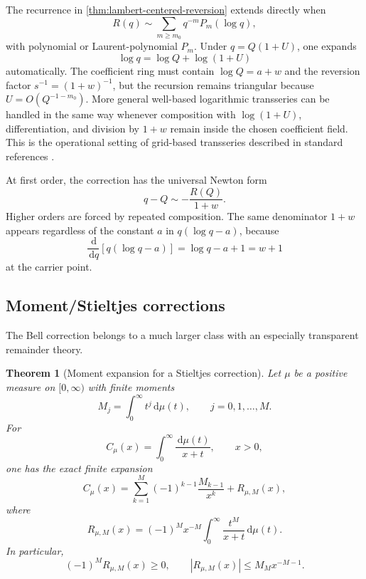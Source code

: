 \documentclass[11pt]{article}
\numberwithin{equation}{section}
\theoremstyle{mainthm}
\newtheorem{theorem}{Theorem}[section]
\theoremstyle{defstyle}
\theoremstyle{remark}
\newcommand{\dd}{\,\mathrm d}
\newcommand{\abs}[1]{\left|#1\right|}
\begin{document}
The recurrence in \cref{thm:lambert-centered-reversion} extends directly when
\begin{equation}\label{eq:R-polylog}
 R(q)\sim\sum_{m\ge m_0}q^{-m}P_m(\log q),
\end{equation}
with polynomial or Laurent-polynomial \(P_m\).  Under \(q=Q(1+U)\), one expands
\[
 \log q=\log Q+\log(1+U)
\]
automatically.  The coefficient ring must contain \(\log Q=a+w\) and the reversion factor \(s^{-1}=(1+w)^{-1}\), but the recursion remains triangular because \(U=O(Q^{-1-m_0})\).  More general well-based logarithmic transseries can be handled in the same way whenever composition with \(\log(1+U)\), differentiation, and division by \(1+w\) remain inside the chosen coefficient field.  This is the operational setting of grid-based transseries described in standard references \cite{VanDerHoeven2006,Edgar2010}.

At first order, the correction has the universal Newton form
\begin{equation}\label{eq:general-first-carrier-correction}
 q-Q\sim-\frac{R(Q)}{1+w}.
\end{equation}
Higher orders are forced by repeated composition.  The same denominator \(1+w\) appears regardless of the constant \(a\) in \(q(\log q-a)\), because
\[
 \frac{\dd}{\dd q}\left[q(\log q-a)\right]
 =\log q-a+1=w+1
\]
at the carrier point.

\subsection{Moment/Stieltjes corrections}

The Bell correction belongs to a much larger class with an especially transparent remainder theory.

\begin{theorem}[Moment expansion for a Stieltjes correction]\label{thm:stieltjes-moment}
Let \(\mu\) be a positive measure on \([0,\infty)\) with finite moments
\begin{equation}\label{eq:moment-Mj}
 M_j=\int_0^\infty t^j\dd\mu(t),\qquad j=0,1,\ldots,M.
\end{equation}
For
\begin{equation}\label{eq:Cmu}
 C_\mu(x)=\int_0^\infty\frac{\dd\mu(t)}{x+t},\qquad x>0,
\end{equation}
one has the exact finite expansion
\begin{equation}\label{eq:Cmu-expansion}
 C_\mu(x)=\sum_{k=1}^{M}(-1)^{k-1}\frac{M_{k-1}}{x^k}
 +R_{\mu,M}(x),
\end{equation}
where
\begin{equation}\label{eq:Cmu-rem}
 R_{\mu,M}(x)=(-1)^Mx^{-M}
 \int_0^\infty\frac{t^M}{x+t}\dd\mu(t).
\end{equation}
In particular,
\begin{equation}\label{eq:Cmu-bound}
 (-1)^MR_{\mu,M}(x)\ge0,
 \qquad
 \abs{R_{\mu,M}(x)}\le M_Mx^{-M-1}.
\end{equation}
\end{theorem}
\end{document}
